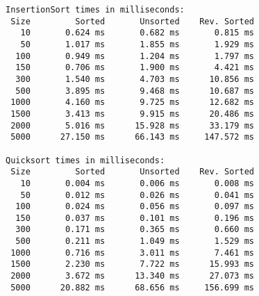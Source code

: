 \documentclass{article}
\begin{document}
\begin{lstlisting}
InsertionSort times in milliseconds:                                                          
 Size         Sorted       Unsorted    Rev. Sorted                                              
   10       0.624 ms       0.682 ms       0.815 ms                                              
   50       1.017 ms       1.855 ms       1.929 ms                                             
  100       0.949 ms       1.204 ms       1.797 ms                                             
  150       0.706 ms       1.900 ms       4.421 ms                                             
  300       1.540 ms       4.703 ms      10.856 ms                                             
  500       3.895 ms       9.468 ms      10.687 ms                                            
 1000       4.160 ms       9.725 ms      12.682 ms                                            
 1500       3.413 ms       9.915 ms      20.486 ms                                            
 2000       5.016 ms      15.928 ms      33.179 ms                                            
 5000      27.150 ms      66.143 ms     147.572 ms                                                                                                                                                                                                                                     

Quicksort times in milliseconds:                                                              
 Size         Sorted       Unsorted    Rev. Sorted                                              
   10       0.004 ms       0.006 ms       0.008 ms                                              
   50       0.012 ms       0.026 ms       0.041 ms                                             
  100       0.024 ms       0.056 ms       0.097 ms                                             
  150       0.037 ms       0.101 ms       0.196 ms                                             
  300       0.171 ms       0.365 ms       0.660 ms                                             
  500       0.211 ms       1.049 ms       1.529 ms                                            
 1000       0.716 ms       3.011 ms       7.461 ms                                            
 1500       2.230 ms       7.722 ms      15.993 ms                                            
 2000       3.672 ms      13.340 ms      27.073 ms                                            
 5000      20.882 ms      68.656 ms     156.699 ms                                                                                                                                                                                                                                     


\end{lstlisting}
\end{document}
